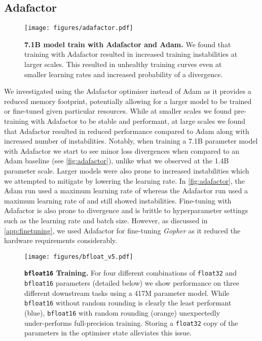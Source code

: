 \documentclass[11pt, a4paper, logo, internal, copyright, nonumbering]{deepmind}
\newcommand{\gopher}{\textit{Gopher}\xspace}
\begin{document}
\subsection{Adafactor}
\begin{figure*}[t]
    \centering
    \texttt{[image: figures/adafactor.pdf]}
    \caption{\textbf{7.1B model train with Adafactor and Adam.}
    We found that training with Adafactor resulted in increased training instabilities at larger scales. This resulted in unhealthy training curves even at smaller learning rates and increased probability of a divergence. 
    }
    \label{fig:adafactor}
\end{figure*}  
We investigated using the Adafactor \citep{shazeer2018Adafactor} optimiser instead of Adam as it provides a reduced memory footprint, potentially allowing for a larger model to be trained or fine-tuned given particular resources.
While at smaller scales we found pre-training with Adafactor to be stable and performant, at large scales we found that Adafactor resulted in reduced performance compared to Adam along with increased number of instabilities. Notably, when training a 7.1B parameter model with Adafactor we start to see minor loss divergences when compared to an Adam baseline (see \autoref{fig:adafactor}), unlike what we observed at the 1.4B parameter scale.
Larger models were also prone to increased instabilities which we attempted to mitigate by lowering the learning rate. In \autoref{fig:adafactor}, the Adam run used a maximum learning rate of  whereas the Adafactor run used a maximum learning rate of  and still showed instabilities.
Fine-tuning with Adafactor is also prone to divergence and is brittle to hyperparameter settings such as the learning rate and batch size.
However, as discussed in \autoref{app:finetuning}, we used Adafactor for fine-tuning \gopher as it reduced the hardware requirements considerably.


\label{sec:bf16}
\begin{figure*}[ht]
    \centering
    \texttt{[image: figures/bfloat\_v5.pdf]}
    \caption{\textbf{\texttt{bfloat16} Training.}
    For four different combinations of \texttt{float32} and \texttt{bfloat16} parameters (detailed below) we show performance on three different downstream tasks using a 417M parameter model. 
    While \texttt{bfloat16} without random rounding is clearly the least performant (blue), \texttt{bfloat16} with random rounding (orange) unexpectedly under-performs full-precision training.
    Storing a \texttt{float32} copy of the parameters in the optimiser state alleviates this issue.
    }
    \label{fig:bf}
\end{figure*}
\end{document}
